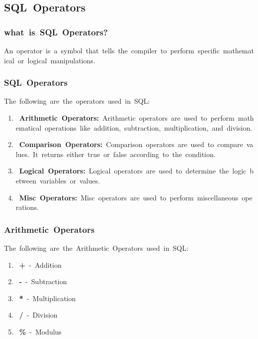 \documentclass{article}
\begin{document}
	\subsection{\textbf{SQL Operators}} 
	\subsubsection{\textbf{what is SQL Operators?}} 
	An operator is a symbol that tells the compiler to perform specific mathematical or logical manipulations. 
	
	\subsubsection{\textbf{SQL Operators}} 
	The following are the operators used in SQL: 
	\begin{enumerate} 
		\item \textbf{Arithmetic Operators:} Arithmetic operators are used to perform mathematical operations like addition, subtraction, multiplication, and division. 
		\item \textbf{Comparison Operators:} Comparison operators are used to compare values. It returns either true or false according to the condition. 
		\item \textbf{Logical Operators:} Logical operators are used to determine the logic between variables or values. 
		\item \textbf{Misc Operators:} Misc operators are used to perform miscellaneous operations. 
	\end{enumerate} 
	
	\subsubsection{\textbf{Arithmetic Operators}} 
	The following are the Arithmetic Operators used in SQL: 
	\begin{enumerate} 
		\item \textbf{+} - Addition 
		\item \textbf{-} - Subtraction 
		\item \textbf{*} - Multiplication 
		\item \textbf{/} - Division 
		\item \textbf{\%} - Modulus 
	\end{enumerate} 
	
\end{document}
